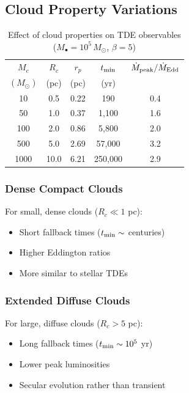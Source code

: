 \documentclass[twocolumn,amsmath,amssymb,prd,superscriptaddress,nofootinbib]{revtex4-2}
\begin{document}
\subsection{Cloud Property Variations}
\label{sec:cloud_variations}

\begin{table}[h]
\centering
\caption{Effect of cloud properties on TDE observables ($M_\bullet = 10^5\,M_\odot$, $\beta = 5$)}
\label{tab:cloud_survey}
\begin{tabular}{ccccc}
\toprule
$M_c$ & $R_c$ & $r_p$ & $t_{\rm min}$ & $\dot{M}_{\rm peak}/\dot{M}_{\rm Edd}$ \\
$(M_\odot)$ & (pc) & (pc) & (yr) & \\
\midrule
10 & 0.5 & 0.22 & 190 & 0.4 \\
50 & 1.0 & 0.37 & 1,100 & 1.6 \\
100 & 2.0 & 0.86 & 5,800 & 2.0 \\
500 & 5.0 & 2.69 & 57,000 & 3.2 \\
1000 & 10.0 & 6.21 & 250,000 & 2.9 \\
\bottomrule
\end{tabular}
\end{table}

\subsubsection{Dense Compact Clouds}

For small, dense clouds ($R_c \ll 1$ pc):
\begin{itemize}
    \item Short fallback times ($t_{\rm min} \sim$ centuries)
    \item Higher Eddington ratios
    \item More similar to stellar TDEs
\end{itemize}

\subsubsection{Extended Diffuse Clouds}

For large, diffuse clouds ($R_c > 5$ pc):
\begin{itemize}
    \item Long fallback times ($t_{\rm min} \sim 10^5$ yr)
    \item Lower peak luminosities
    \item Secular evolution rather than transient
\end{itemize}
\end{document}
